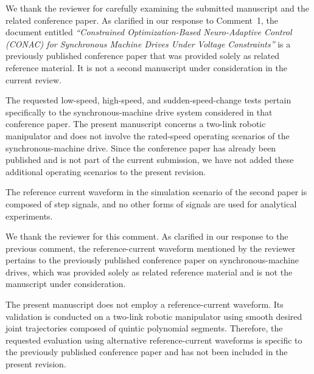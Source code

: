 \documentclass[12pt,english]{reviewresponse}
\begin{document}
\begin{revresponse}
  We thank the reviewer for carefully examining the submitted manuscript and the related conference paper. 
  As clarified in our response to Comment~1, the document entitled \textit{``Constrained Optimization-Based Neuro-Adaptive Control (CONAC) for Synchronous Machine Drives Under Voltage Constraints''} is a previously published conference paper that was provided solely as related reference material. It is not a second manuscript under consideration in the current review.

  \bigskip

  The requested low-speed, high-speed, and sudden-speed-change tests pertain specifically to the synchronous-machine drive system considered in that conference paper. 
  The present manuscript concerns a two-link robotic manipulator and does not involve the rated-speed operating scenarios of the synchronous-machine drive. 
  Since the conference paper has already been published and is not part of the current submission, we have not added these additional operating scenarios to the present revision.
  
\end{revresponse}

% 
\begin{revcomment}[2][1]{}
	The reference current waveform in the simulation scenario of the second paper is composed of step signals, and no other forms of signals are used for analytical experiments.
\end{revcomment}

\begin{revresponse}
  We thank the reviewer for this comment. 
  As clarified in our response to the previous comment, the reference-current waveform mentioned by the reviewer pertains to the previously published conference paper on synchronous-machine drives, which was provided solely as related reference material and is not the manuscript under consideration.

  The present manuscript does not employ a reference-current waveform. 
  Its validation is conducted on a two-link robotic manipulator using smooth desired joint trajectories composed of quintic polynomial segments. 
  Therefore, the requested evaluation using alternative reference-current waveforms is specific to the previously published conference paper and has not been included in the present revision.
\end{revresponse}
\end{document}
